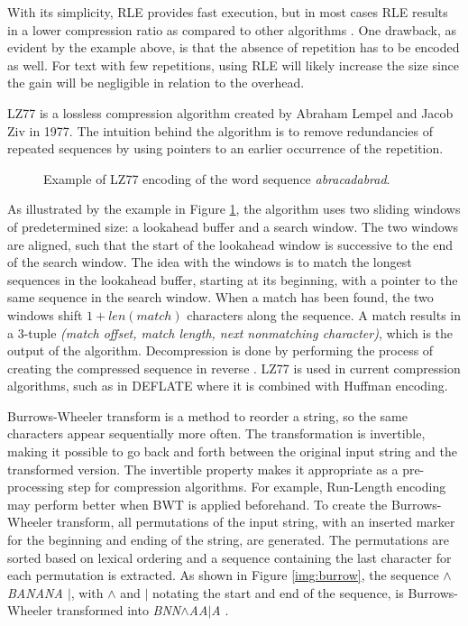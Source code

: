 With its simplicity, RLE provides fast execution, but in most cases RLE results in a lower compression ratio as compared to other algorithms \cite{Sharma2010CompressionUH}. One drawback, as evident by the example above, is that the absence of repetition has to be encoded as well. For text with few repetitions, using RLE will likely increase the size since the gain will be negligible in relation to the overhead. 


LZ77 is a lossless compression algorithm created by Abraham Lempel and Jacob Ziv in 1977. The intuition behind the algorithm is to remove redundancies of repeated sequences by using pointers to an earlier occurrence of the repetition. 

\begin{figure}[htbp]
    \centering
    
    \caption{Example of LZ77 encoding of the word sequence \textit{abracadabrad}.}
    \label{img:lz77}
\end{figure}


As illustrated by the example in Figure \ref{img:lz77}, the algorithm uses two sliding windows of predetermined size: a lookahead buffer and a search window. The two windows are aligned, such that the start of the lookahead window is successive to the end of the search window. The idea with the windows is to match the longest sequences in the lookahead buffer, starting at its beginning, with a pointer to the same sequence in the search window. When a match has been found, the two windows shift \(1 + len(match)\) characters along the sequence. A match results in a 3-tuple \textit{(match offset, match length, next nonmatching character)}, which is the output of the algorithm. Decompression is done by performing the process of creating the compressed sequence in reverse \cite{10.1145/356924.356930}. LZ77 is used in current compression algorithms, such as in DEFLATE where it is combined with Huffman encoding. 

Burrows-Wheeler transform is a method to reorder a string, so the same characters appear sequentially more often. The transformation is invertible, making it possible to go back and forth between the original input string and the transformed version. The invertible property makes it appropriate as a pre-processing step for compression algorithms. For example, Run-Length encoding may perform better when BWT is applied beforehand. To create the Burrows-Wheeler transform, all permutations of the input string, with an inserted marker for the beginning and ending of the string, are generated. The permutations are sorted based on lexical ordering and a sequence containing the last character for each permutation is extracted. As shown in Figure \ref{img:burrow}, the sequence \textit{$\wedge$BANANA $\mid$}, with $\wedge$ and $\mid$ notating the start and end of the sequence, is Burrows-Wheeler transformed into \textit{BNN$\wedge$AA$\mid$A} \cite{Burrows1994ABL}.

